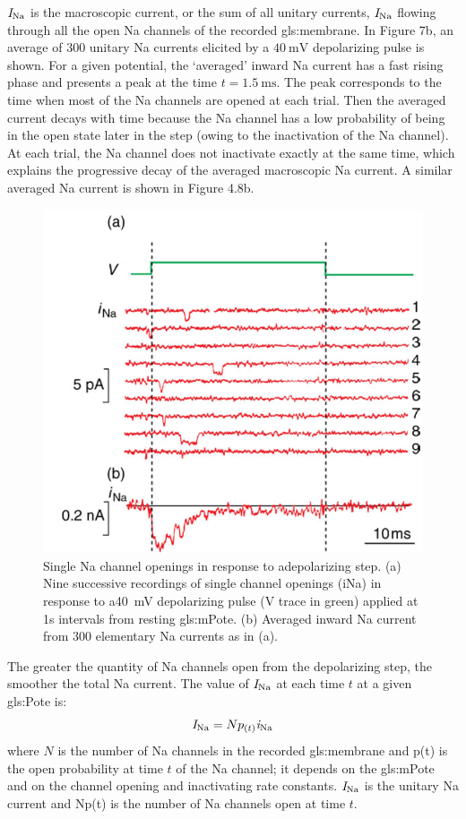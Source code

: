 \documentclass[class={myRUCProject}, crop=false]{standalone}
\begin{document}
\(\mathit{I}_\mathrm{Na}\) is the macroscopic current, or the sum of all unitary currents, \(\mathit{I}_\mathrm{Na}\) flowing through all the open \gls{Na} channels of the recorded \gls{gls:membrane}. In Figure 7b, an average of \(\num{300}\) unitary \gls{Na} currents elicited by a \(\qty{40}{\mV}\) depolarizing pulse is shown. For a given potential, the `averaged' inward \gls{Na} current has a fast rising phase and presents a peak at the time \(t=\qty{1.5}{\ms}\). The peak corresponds to the time when most of the \gls{Na} channels are opened at each trial. Then the averaged current decays with time because the \gls{Na} channel has a low probability of being in the open state later in the step (owing to the inactivation of the \gls{Na} channel). At each trial, the \gls{Na} channel does not inactivate exactly at the same time, which explains the progressive decay of the averaged macroscopic \gls{Na} current. A similar averaged \gls{Na} current is shown in Figure 4.8b. %

\begin{figure}[H]
  \centering
  \includegraphics[width=0.5\linewidth]{Pictures//Anakin/iNa.png}
  \caption{Single \gls{Na} channel openings in response to adepolarizing step. (a) Nine successive recordings of single channel openings (iNa) in response to a\qty{ 40}{\mV} depolarizing pulse (V trace in green) applied at 1s intervals from resting \gls{gls:mPote}. (b) Averaged inward \gls{Na} current from 300 elementary \gls{Na} currents as in (a). }
  \label{fig:unitcurNa}
\end{figure}

The greater the quantity of \gls{Na} channels open from the depolarizing step, the smoother the total \gls{Na} current. The value of \(\mathit{I}_\mathrm{Na}\) at each time \(t\) at a given \gls{gls:Pote} is: 
\begin{equation}
  \mathit{I}_\mathrm{Na}=N p_{(t)} \mathit{i}_\mathrm{Na}
\end{equation}
where \(N\) is the number of \gls{Na} channels in the recorded \gls{gls:membrane} and p(t) is the open probability at time \(t\) of the \gls{Na} channel; it depends on the \gls{gls:mPote} and on the channel opening and inactivating rate constants. \(\mathit{I}_\mathrm{Na}\) is the unitary \gls{Na} current and Np(t) is the number of \gls{Na} channels open at time \(t\). 
\end{document}
